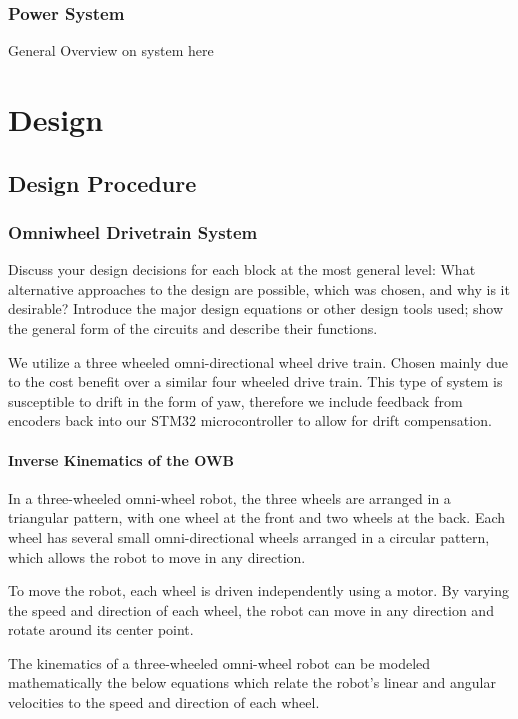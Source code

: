 \documentclass{report}
\begin{document}
    \subsection{Power System}
    General Overview on system here


    \chapter{Design}
    \section{Design Procedure}

    \subsection{Omniwheel Drivetrain System}
    \label{sec:Omniwheel-DesignProcedure}
    Discuss your design decisions for each block at the most general level: What alternative approaches to the design are possible, which was chosen, and why is it desirable? Introduce the major design equations or other design tools used; show the general form of the circuits and describe their functions.

    We utilize a three wheeled omni-directional wheel drive train. Chosen mainly due to the cost benefit over a similar four wheeled drive train. This type of system is susceptible to drift in the form of yaw, therefore we include feedback from encoders back into our STM32 microcontroller to allow for drift compensation.

    \subsubsection{Inverse Kinematics of the OWB}
    \label{sec:Omniwheel-InverseKinematics}
    In a three-wheeled omni-wheel robot, the three wheels are arranged in a triangular pattern, with one wheel at the front and two wheels at the back. Each wheel has several small omni-directional wheels arranged in a circular pattern, which allows the robot to move in any direction.
    
    To move the robot, each wheel is driven independently using a motor. By varying the speed and direction of each wheel, the robot can move in any direction and rotate around its center point.
    
    The kinematics of a three-wheeled omni-wheel robot can be modeled mathematically the below equations \cite{riky2021omnidirectional} which relate the robot's linear and angular velocities to the speed and direction of each wheel.
    
\end{document}
